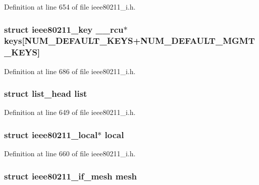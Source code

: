 Definition at line 654 of file ieee80211\-\_\-i.\-h.

\hypertarget{structieee80211__sub__if__data_ad9d8249bd02068d887fd83a256bd0549}{
\subsubsection[{keys}]{\setlength{\rightskip}{0pt plus 5cm}struct {\bf ieee80211\-\_\-key} \-\_\-\-\_\-rcu$\ast$ keys\mbox{[}{\bf N\-U\-M\-\_\-\-D\-E\-F\-A\-U\-L\-T\-\_\-\-K\-E\-Y\-S}+{\bf N\-U\-M\-\_\-\-D\-E\-F\-A\-U\-L\-T\-\_\-\-M\-G\-M\-T\-\_\-\-K\-E\-Y\-S}\mbox{]}}}\label{structieee80211__sub__if__data_ad9d8249bd02068d887fd83a256bd0549}


Definition at line 686 of file ieee80211\-\_\-i.\-h.

\hypertarget{structieee80211__sub__if__data_a1f00f18b91d5a820f2c43064243aa86e}{
\subsubsection[{list}]{\setlength{\rightskip}{0pt plus 5cm}struct list\-\_\-head list}}\label{structieee80211__sub__if__data_a1f00f18b91d5a820f2c43064243aa86e}


Definition at line 649 of file ieee80211\-\_\-i.\-h.

\hypertarget{structieee80211__sub__if__data_ad436a024f420f219c4fe2eebce7e4ab2}{
\subsubsection[{local}]{\setlength{\rightskip}{0pt plus 5cm}struct {\bf ieee80211\-\_\-local}$\ast$ local}}\label{structieee80211__sub__if__data_ad436a024f420f219c4fe2eebce7e4ab2}


Definition at line 660 of file ieee80211\-\_\-i.\-h.

\hypertarget{structieee80211__sub__if__data_aa9083f90f4d38afa13c9d233a07a6d9d}{
\subsubsection[{mesh}]{\setlength{\rightskip}{0pt plus 5cm}struct {\bf ieee80211\-\_\-if\-\_\-mesh} mesh}}\label{structieee80211__sub__if__data_aa9083f90f4d38afa13c9d233a07a6d9d}


